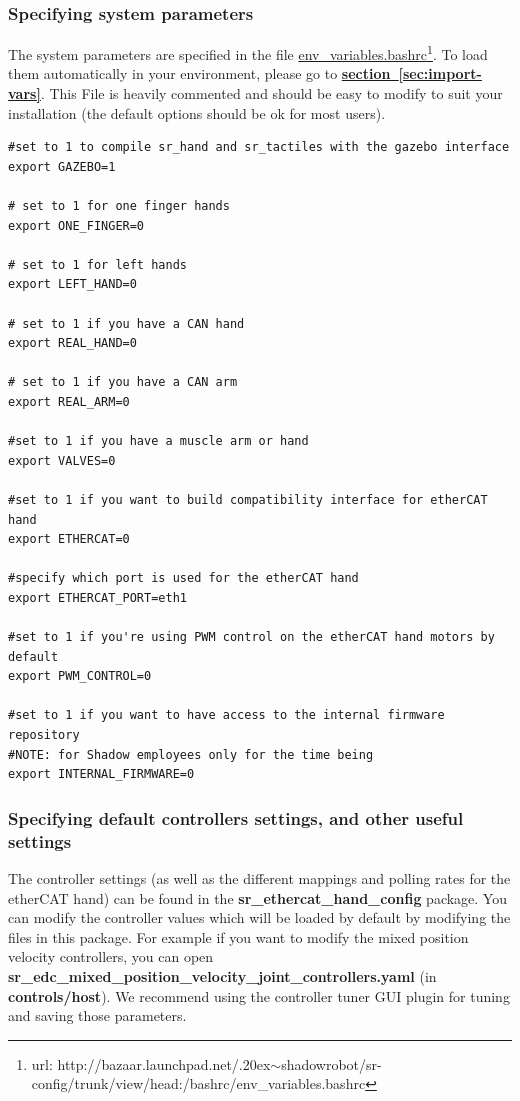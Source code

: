 \documentclass[12pt]{article}
\newcommand{\linuxtilde}{\raise.20ex\hbox{$\scriptstyle\mathtt{\sim}$}}
\newcommand{\link}[1]{\hyperref[sec:#1]{\textbf{section~\ref*{sec:#1}}}}
\begin{document}
\subsubsection{Specifying system parameters}
\label{sec:spec-system-param}
\par The system parameters are specified in the file
\href{http://bazaar.launchpad.net/~shadowrobot/sr-config/trunk/view/head:/bashrc/env_variables.bashrc}{env\_variables.bashrc}\footnote{url: http://bazaar.launchpad.net/\linuxtilde shadowrobot/sr-config/trunk/view/head:/bashrc/env\_variables.bashrc}. To load them automatically in your environment, please go to \link{import-vars}. This File is heavily commented and should be easy to modify to suit your installation (the default options should be ok for most users).

  \begin{lstlisting}[title={\textbf{env\_variables.bashrc}}, upquote=true]
#set to 1 to compile sr_hand and sr_tactiles with the gazebo interface
export GAZEBO=1

# set to 1 for one finger hands
export ONE_FINGER=0

# set to 1 for left hands
export LEFT_HAND=0

# set to 1 if you have a CAN hand
export REAL_HAND=0

# set to 1 if you have a CAN arm
export REAL_ARM=0

#set to 1 if you have a muscle arm or hand
export VALVES=0

#set to 1 if you want to build compatibility interface for etherCAT hand
export ETHERCAT=0

#specify which port is used for the etherCAT hand
export ETHERCAT_PORT=eth1

#set to 1 if you're using PWM control on the etherCAT hand motors by default
export PWM_CONTROL=0

#set to 1 if you want to have access to the internal firmware repository
#NOTE: for Shadow employees only for the time being
export INTERNAL_FIRMWARE=0
  \end{lstlisting}


\subsubsection{Specifying default controllers settings, and other useful settings}
\label{sec:spec-defa-contr}
\par The controller settings (as well as the different mappings and polling rates for the etherCAT hand) can be found in the \textbf{sr\_ethercat\_hand\_config} package. You can modify the controller values which will be loaded by default by modifying the files in this package. For example if you want to modify the mixed position velocity controllers, you can open \textbf{sr\_edc\_mixed\_position\_velocity\_joint\_controllers.yaml} (in \textbf{controls/host}). We recommend using the controller tuner GUI plugin for tuning and saving those parameters.
\end{document}
